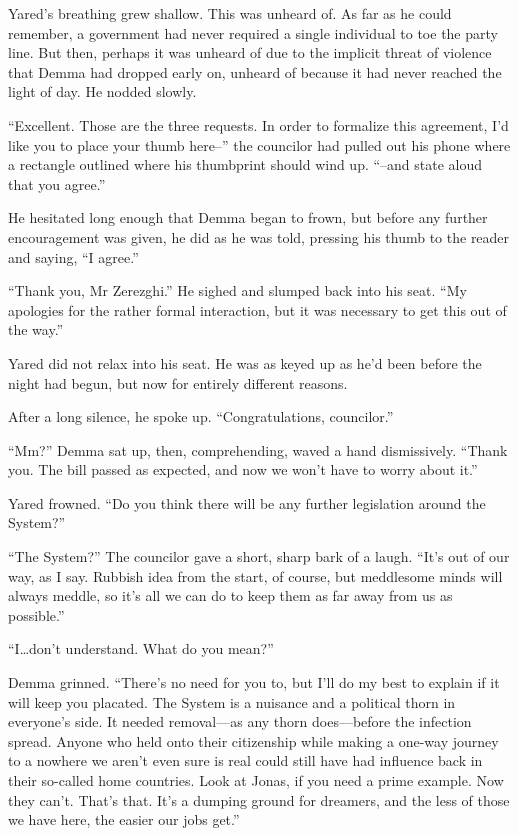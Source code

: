 Yared's breathing grew shallow. This was unheard of. As far as he could remember, a government had never required a single individual to toe the party line. But then, perhaps it was unheard of due to the implicit threat of violence that Demma had dropped early on, unheard of because it had never reached the light of day. He nodded slowly.

``Excellent. Those are the three requests. In order to formalize this agreement, I'd like you to place your thumb here--'' the councilor had pulled out his phone where a rectangle outlined where his thumbprint should wind up. ``--and state aloud that you agree.''

He hesitated long enough that Demma began to frown, but before any further encouragement was given, he did as he was told, pressing his thumb to the reader and saying, ``I agree.''

``Thank you, Mr Zerezghi.'' He sighed and slumped back into his seat. ``My apologies for the rather formal interaction, but it was necessary to get this out of the way.''

Yared did not relax into his seat. He was as keyed up as he'd been before the night had begun, but now for entirely different reasons.

After a long silence, he spoke up. ``Congratulations, councilor.''

``Mm?'' Demma sat up, then, comprehending, waved a hand dismissively. ``Thank you. The bill passed as expected, and now we won't have to worry about it.''

Yared frowned. ``Do you think there will be any further legislation around the System?''

``The System?'' The councilor gave a short, sharp bark of a laugh. ``It's out of our way, as I say. Rubbish idea from the start, of course, but meddlesome minds will always meddle, so it's all we can do to keep them as far away from us as possible.''

``I\ldots don't understand. What do you mean?''

Demma grinned. ``There's no need for you to, but I'll do my best to explain if it will keep you placated. The System is a nuisance and a political thorn in everyone's side. It needed removal---as any thorn does---before the infection spread. Anyone who held onto their citizenship while making a one-way journey to a nowhere we aren't even sure is real could still have had influence back in their so-called home countries. Look at Jonas, if you need a prime example. Now they can't. That's that. It's a dumping ground for dreamers, and the less of those we have here, the easier our jobs get.''

